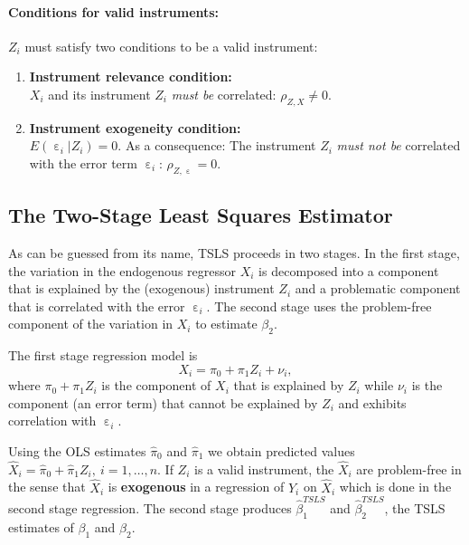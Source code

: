 \documentclass[
  14pt,
]{memoir}
\DeclareMathOperator{\eps}{\varepsilon}
\begin{document}
\paragraph*{Conditions for valid instruments:}

\(Z_i\) must satisfy two conditions to be a valid instrument:

\begin{enumerate}
\item \textbf{Instrument relevance condition:}\\
$X_i$ and its instrument $Z_i$ \emph{must be} correlated: $\rho_{Z,X} \neq 0$.
\item \textbf{Instrument exogeneity condition:}\\
$E(\eps_i|Z_i)=0$. As a consequence: The instrument $Z_i$ \emph{must not be} correlated with the error term $\eps_i$: $\rho_{Z,\eps} = 0$.
\end{enumerate}

\hypertarget{the-two-stage-least-squares-estimator}{%
\subsection{The Two-Stage Least Squares Estimator}\label{the-two-stage-least-squares-estimator}}

As can be guessed from its name, TSLS proceeds in two stages. In the first stage, the variation in the endogenous regressor \(X_i\) is decomposed into a  component that is explained by the (exogenous) instrument \(Z_i\) and a problematic component that is correlated with the error \(\eps_i\). The second stage uses the problem-free component of the variation in \(X_i\) to estimate \(\beta_2\).

The first stage regression model is
\[
X_i = \pi_0 + \pi_1 Z_i + \nu_i,
\]
where \(\pi_0 + \pi_1 Z_i\) is the component of \(X_i\) that is explained by \(Z_i\) while \(\nu_i\) is the component (an error term) that cannot be explained by \(Z_i\) and exhibits correlation with \(\eps_i\).

Using the OLS estimates \(\widehat{\pi}_0\) and \(\widehat{\pi}_1\) we obtain predicted values \(\widehat{X}_i=\hat\pi_0+\hat\pi_1 Z_i,\ i=1,\dots,n\). If \(Z_i\) is a valid instrument, the \(\widehat{X}_i\) are problem-free in the sense that \(\widehat{X}_i\) is \textbf{exogenous} in a regression of \(Y_i\) on \(\widehat{X}_i\) which is done in the second stage regression. The second stage produces \(\widehat{\beta}_1^{TSLS}\) and \(\widehat{\beta}_2^{TSLS}\), the TSLS estimates of \(\beta_1\) and \(\beta_2\).
\end{document}
